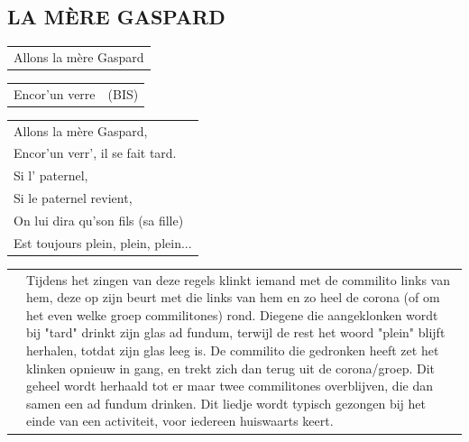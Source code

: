 \documentclass{article}
\begin{document}
\subsection*{LA MÈRE GASPARD}
\begin{flushleft}
\begin{tabularx}{\textwidth} {
    >{\raggedright\arraybackslash}X}
Allons la mère Gaspard\\
\end{tabularx}
\begin{tabularx}{0.5\textwidth} {
    >{\raggedright\arraybackslash}X|c}
Encor’un verre & (BIS)\\
\end{tabularx}
\begin{tabularx}{\textwidth} {
    >{\raggedright\arraybackslash}X}
Allons la mère Gaspard,\\
Encor’un verr’, il se fait tard.\\
Si l’ paternel,\\
Si le paternel revient,\\
On lui dira qu’son fils (sa fille)\\
Est toujours plein, plein, plein...\\
\end{tabularx}
\end{flushleft}
\begin{flushleft}
\begin{tabularx}{\textwidth} {
    c >{\raggedright\arraybackslash}X}
 \hspace{5mm} & {\small Tijdens het zingen van deze regels klinkt iemand met de commilito links van hem, deze op zijn beurt met die links van hem en zo heel de corona (of om het even welke groep commilitones) rond. Diegene die aangeklonken wordt bij "tard" drinkt zijn glas ad fundum, terwijl de rest het woord "plein" blijft herhalen, totdat zijn glas leeg is. De commilito die gedronken heeft zet het klinken opnieuw in gang, en trekt zich dan terug uit de corona/groep. Dit geheel wordt herhaald tot er maar twee commilitones overblijven, die dan samen een ad fundum drinken. Dit liedje wordt typisch gezongen bij het einde van een activiteit, voor iedereen huiswaarts keert.}
\end{tabularx}
\end{flushleft}
\end{document}
